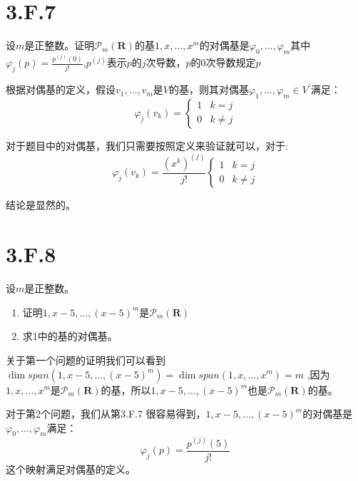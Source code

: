 \documentclass[10pt,a4paper,UTF8]{article}
\begin{document}
\section{3.F.7}
\label{sec:org9a7b87f}


\begin{problem}
设\(m\)是正整数。证明\(\mathcal{P}_{m}(\mathbf{R})\)的基\(1,x,\ldots ,x^{m}\)的对偶基是\(\varphi_{0},\ldots ,\varphi_{m}\)其中\(\varphi_{j}(p) = \frac{p^{(j)}(0)}{j!}\),\(p^{(j)}\)表示\(p\)的\(j\)次导数，\(p\)的\(0\)次导数规定\(p\)
\end{problem}

\begin{answer}
根据对偶基的定义，假设\(v_{1},\ldots ,v_{m}\)是\(V\)的基，则其对偶基\(\varphi_{1},\ldots ,\varphi_{m}\in V^{'}\)满足：
\begin{equation}
\label{eq:3}
\varphi_{j}(v_{k}) =
\begin{cases}
1 & k=j \\
0 & k\neq j
\end{cases}
\end{equation}

对于题目中的对偶基，我们只需要按照定义来验证就可以，对于:
\begin{equation}
\label{eq:4}
\varphi_{j}(v_{k}) = \frac{(x^{k})^{(j)}}{j!}
\begin{cases}
1 & k = j \\
0 & k\neq j
\end{cases}
\end{equation}

结论是显然的。
\end{answer}
\section{3.F.8}
\label{sec:org060de27}


\begin{problem}
设\(m\)是正整数。

\begin{enumerate}
\item 证明\(1,x-5,\ldots ,(x-5)^{m}\)是\(\mathcal{P}_{m}(\mathbf{R})\)
\item 求1中的基的对偶基。
\end{enumerate}
\end{problem}

\begin{answer}
关于第一个问题的证明我们可以看到\(\dim span(1,x-5,\ldots ,(x-5)^{m}) = \dim span(1,x,\ldots ,x^{m}) = m\) ,因为\(1,x,\ldots ,x^{m}\)是\(\mathcal{P}_{m}(\mathbf{R})\)的基，所以\(1,x-5,\ldots ,(x-5)^{m}\)也是\(\mathcal{P}_{m}(\mathbf{R})\)的基。

对于第2个问题，我们从第3.F.7 很容易得到，\(1,x-5,\ldots ,(x-5)^{m}\)的对偶基是\(\varphi_{0},\ldots ,\varphi_{m}\)满足：\[ \varphi_{j}(p) = \frac{p^{(j)}(5)}{j!}\] 这个映射满足对偶基的定义。
\end{answer}
\end{document}
